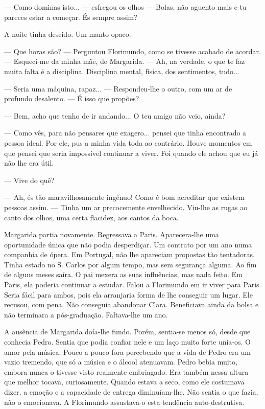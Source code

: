 --- Como dominas isto... --- esfregou os olhos --- Bolas, não aguento mais e tu
pareces estar a começar. És sempre assim?

A noite tinha descido. Um manto opaco.

--- Que horas são? --- Perguntou Florimundo, como se tivesse acabado de
acordar. --- Esqueci-me da minha mãe, de Margarida. --- Ah, na verdade, o
que te faz muita falta é a disciplina. Disciplina mental, física, dos
sentimentos, tudo...

--- Seria uma máquina, rapaz... --- Respondeu-lhe o outro, com um ar de
profundo desalento. --- É isso que propões?

--- Bem, acho que tenho de ir andando... O teu amigo não veio, ainda?

--- Como vês, para não pensares que exagero... pensei que tinha encontrado
a pessoa ideal. Por ele, pus a minha vida toda ao contrário. Houve
momentos em que pensei que seria impossível continuar a viver. Foi
quando ele achou que eu já não lhe era útil.

--- Vive do quê?

--- Ah, és tão maravilhosamente ingénuo! Como é bom acreditar que existem
pessoas assim. --- Tinha um ar precocemente envelhecido. Viu-lhe as rugas
ao canto dos olhos, uma certa flacidez, aos cantos da boca.

Margarida partia novamente. Regressava a Paris. Aparecera-lhe uma
oportunidade única que não podia desperdiçar. Um contrato por um ano
numa companhia de ópera. Em Portugal, não lhe apareciam propostas tão
tentadoras. Tinha estado no S. Carlos por algum tempo, mas sem segurança
alguma. Ao fim de alguns meses saíra. O pai mexera as suas influências,
mas nada feito. Em Paris, ela poderia continuar a estudar. Falou a
Florimundo em ir viver para Paris. Seria fácil para ambos, pois ela
arranjaria forma de lhe conseguir um lugar. Ele recusou, com pena. Não
conseguia abandonar Clara. Beneficiava ainda da bolsa e não terminara a
pós-graduação. Faltava-lhe um ano.

A ausência de Margarida doía-lhe fundo. Porém, sentia-se menos só, desde
que conhecia Pedro. Sentia que podia confiar nele e um laço muito forte
unia-os. O amor pela música. Pouco a pouco fora percebendo que a vida de
Pedro era um vazio tremendo, que só a música e o álcool atenuavam. Pedro
bebia muito, embora nunca o tivesse visto realmente embriagado. Era
também nessa altura que melhor tocava, curiosamente. Quando estava a
seco, como ele costumava dizer, a emoção e a capacidade de entrega
diminuíam-lhe. Não sentia o que fazia, não o emocionava. A Florimundo
assustava-o esta tendência auto-destrutiva.

